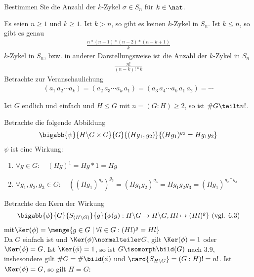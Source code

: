 \begin{uebungsblatt}
	\setcounter{taskcount}{67}
	\begin{uebung}
		Bestimmen Sie die Anzahl der $k$-Zykel $\sigma \in S_n$ für $k \in \nat$.
	\end{uebung}
	\begin{loesung}
		Es seien $n \geq 1$ und $k \geq 1$. Ist $k > n$, so gibt es keinen $k$-Zykel in $S_n$. Ist $k \leq n$, so gibt es genau
		\begin{align*}
			\frac{n*(n-1)*(n-2) * (n-k+1)}{k}
		\end{align*}
		$k$-Zykel in $S_n$, bzw. in anderer Darstellungsweise ist die Anzahl der $k$-Zykel in $S_n$
		\begin{align*}
			\frac{n!}{(n-k)! * k}
		\end{align*}
		Betrachte zur Veranschaulichung 
		\begin{align*}
			(a_1 \, a_2 \cdots a_k) = (a_2 \, a_3 \cdots a_k \, a_1) = (a_3 \, a_4 \cdots a_k \, a_1 \, a_2) = \cdots
		\end{align*}
	\end{loesung}
	\begin{uebung}
		Ist $G$ endlich und einfach und $H \leq G$ mit $n = (G:H) \geq 2$, so ist $\# G \teilt n!$.
	\end{uebung}
	\begin{loesung}
		Betrachte die folgende Abbildung
		\begin{align*}
			\bigabb{\psi}{H \backslash G \times G}{G}{(Hg_1, g_2)}{(Hg_1)^{g_2} = H g_1 g_2}
		\end{align*}
		$\psi$ ist eine Wirkung:
		\begin{enumerate}[label=(\roman*)]
			\item $\forall g \in G : \quad (Hg)^1 = Hg*1 = Hg$
			\item $\forall g_1, g_2, g_3 \in G: \quad \left((Hg_1)^{g_2}\right)^{g_3} = \left( Hg_1 g_2 \right)^{g_3} = H g_1 g_2 g_3 = \left( H g_1 \right)^{g_2 * g_3}$
		\end{enumerate}
		Betrachte den Kern der Wirkung 
		\begin{align*}
			\bigabb{\phi}{G}{S_{(H \backslash G)}}{g}{\phi(g) : H \backslash G \to H \backslash G, Hl \mapsto (Hl)^g} \text{ (vgl. 6.3)}
		\end{align*}
		mit$\Ker(\phi) = \menge{g \in G \mid \forall l \in G : (Hl)^g = Hl}$ \\
		Da $G$ einfach ist und $\Ker(\phi) \normalteiler G$, gilt $\Ker(\phi) = 1$ oder $\Ker(\phi) = G$. Ist $\Ker(\phi) = 1$, so ist $G \isomorph \bild(G)$ nach 3.9, insbesondere gilt $\# G = \# \bild(\phi)$ und $\card{S_{H \backslash G}} = (G:H)! = n!$. Ist $\Ker(\phi) = G$, so gilt $H = G$:

\end{loesung}
\end{uebungsblatt}
